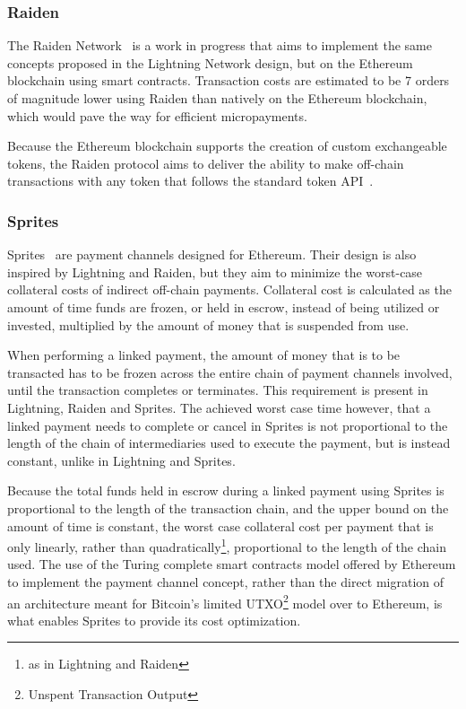 \documentclass[sigconf]{acmart}
\begin{document}
\subsubsection{Raiden}
The Raiden Network~\cite{raiden} is a work in progress that aims to implement the same concepts proposed in the Lightning Network design, but on the Ethereum blockchain using smart contracts. Transaction costs are estimated to be 7 orders of magnitude lower using Raiden than natively on the Ethereum blockchain, which would pave the way for efficient micropayments.


Because the Ethereum blockchain supports the creation of custom exchangeable tokens, the Raiden protocol aims to deliver the ability to make off-chain transactions with any token that follows the standard token API~\cite{wood2014ethereum}.

\subsubsection{Sprites}
Sprites~\cite{sprites} are payment channels designed for Ethereum. Their design is also inspired by Lightning and Raiden, but they aim to minimize the worst-case collateral costs of indirect off-chain payments. Collateral cost is calculated as the amount of time funds are frozen, or held in escrow, instead of being utilized or invested, multiplied by the amount of money that is suspended from use.

When performing a linked payment, the amount of money that is to be transacted has to be frozen across the entire chain of payment channels involved, until the transaction completes or terminates. This requirement is present in Lightning, Raiden and Sprites. The achieved worst case time however, that a linked payment needs to complete or cancel in Sprites is not proportional to the length of the chain of intermediaries used to execute the payment, but is instead constant, unlike in Lightning and Sprites.

Because the total funds held in escrow during a linked payment using Sprites is proportional to the length of the transaction chain, and the upper bound on the amount of time is constant, the worst case collateral cost per payment that is only linearly, rather than quadratically\footnote{as in Lightning and Raiden}, proportional to the length of the chain used. The use of the Turing complete smart contracts model offered by Ethereum to implement the payment channel concept, rather than the direct migration of an architecture meant for Bitcoin's limited UTXO\footnote{Unspent Transaction Output}
model over to Ethereum, is what enables Sprites to provide its cost optimization.
\end{document}
